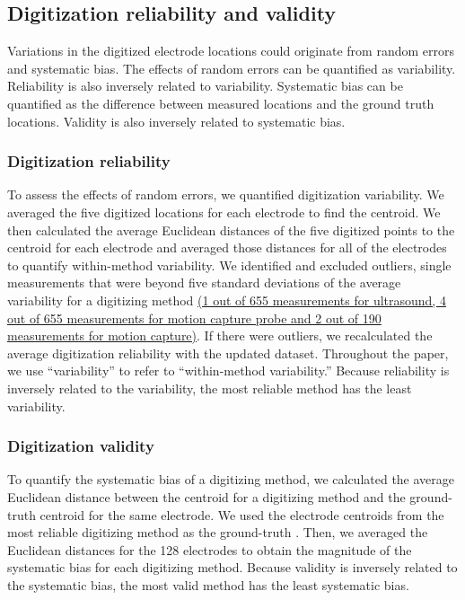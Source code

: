 \documentclass[../thesis_seyed.tex]{subfiles}
\begin{document}
\subsection{Digitization reliability and validity}
Variations in the digitized electrode locations could originate from random errors and systematic bias. The effects of random errors can be quantified as variability. Reliability is also inversely related to variability. Systematic bias can be quantified as the difference between measured locations and the ground truth locations. Validity is also inversely related to systematic bias.

\subsubsection{Digitization reliability}
\label{subsec:digitRel}
To assess the effects of random errors, we quantified digitization variability. We averaged the five digitized locations for each electrode to find the centroid. We then calculated the average Euclidean distances of the five digitized points to the centroid for each electrode and averaged those distances for all of the electrodes to quantify within-method variability. We identified and excluded outliers, single measurements that were beyond five standard deviations of the average variability for a digitizing method \ul{(1 out of 655 measurements for ultrasound, 4 out of 655 measurements for motion capture probe and 2 out of 190 measurements for motion capture)}. If there were outliers, we recalculated the average digitization reliability with the updated dataset. Throughout the paper, we use ``variability'' to refer to ``within-method variability.'' Because reliability is inversely related to the variability, the most reliable method has the least variability. 

\subsubsection{Digitization validity}
To quantify the systematic bias of a digitizing method, we calculated the average Euclidean distance between the centroid for a digitizing method and the ground-truth centroid for the same electrode. We used the electrode centroids from the most reliable digitizing method as the ground-truth \cite{Dalal2014-nk}. Then, we averaged the Euclidean distances for the 128 electrodes to obtain the magnitude of the systematic bias for each digitizing method. Because validity is inversely related to the systematic bias, the most valid method has the least systematic bias. 
\end{document}
